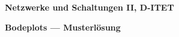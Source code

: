 \documentclass[a4paper,12pt]{article}
\begin{document}
\begin{titlepage}
\thispagestyle{firstpage}
\vspace*{4cm}
\begin{center}
{\Large\bfseries Netzwerke und Schaltungen II, D-ITET\par}
\vspace{3mm}
{\Huge\bfseries Bodeplots — Musterlösung\par}
\vspace{9mm}
\end{center}
\vfill
\end{titlepage}
%
%
%
% 
% 
% 
% 
% 
% 
% 
% 
% 
% 
% 
\end{document}
